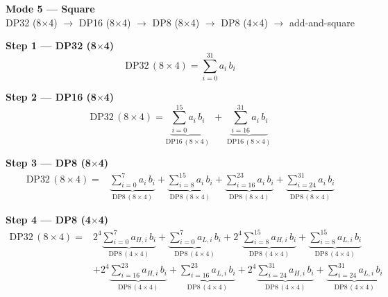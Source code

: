 \documentclass[fleqn]{article}
\newcommand{\DPop}[3]{\mathrm{DP#1}\,(#2\!\times\!#3)}
\begin{document}
\begin{center}
{\LARGE \textbf{Mode 5 --- Square}}\\[4pt]
{\large DP32 (8$\times$4) $\rightarrow$ DP16 (8$\times$4) $\rightarrow$ DP8 (8$\times$4) $\rightarrow$ DP8 (4$\times$4) $\rightarrow$ add-and-square}
\end{center}

\vspace{0.1em}

\textbf{Step 1 --- DP32 (8$\times$4)}
\[
\DPop{32}{8}{4} = \sum_{i=0}^{31} a_i \, b_i
\]

\textbf{Step 2 --- DP16 (8$\times$4)}
\[
\DPop{32}{8}{4}
  = \underbrace{\sum_{i=0}^{15} a_i \, b_i}_{\DPop{16}{8}{4}}
  \; + \; \underbrace{\sum_{i=16}^{31} a_i \, b_i}_{\DPop{16}{8}{4}}
\]

\textbf{Step 3 --- DP8 (8$\times$4)}
\begin{align*}
\DPop{32}{8}{4} = {}
  & \underbrace{\sum_{i=0}^{7} a_i \, b_i}_{\DPop{8}{8}{4}}
  + \underbrace{\sum_{i=8}^{15} a_i \, b_i}_{\DPop{8}{8}{4}}
  + \underbrace{\sum_{i=16}^{23} a_i \, b_i}_{\DPop{8}{8}{4}}
  + \underbrace{\sum_{i=24}^{31} a_i \, b_i}_{\DPop{8}{8}{4}}
\end{align*}

\textbf{Step 4 --- DP8 (4$\times$4)}
\begin{align*}
\DPop{32}{8}{4} = {}
  & 2^{4}\underbrace{\sum_{i=0}^{7} a_{H,i}\, b_i}_{\DPop{8}{4}{4}}
  + \underbrace{\sum_{i=0}^{7} a_{L,i}\, b_i}_{\DPop{8}{4}{4}}
  + 2^{4}\underbrace{\sum_{i=8}^{15} a_{H,i}\, b_i}_{\DPop{8}{4}{4}}
  + \underbrace{\sum_{i=8}^{15} a_{L,i}\, b_i}_{\DPop{8}{4}{4}} \\[0.6em]
  & + 2^{4}\underbrace{\sum_{i=16}^{23} a_{H,i}\, b_i}_{\DPop{8}{4}{4}}
  + \underbrace{\sum_{i=16}^{23} a_{L,i}\, b_i}_{\DPop{8}{4}{4}}
  + 2^{4}\underbrace{\sum_{i=24}^{31} a_{H,i}\, b_i}_{\DPop{8}{4}{4}}
  + \underbrace{\sum_{i=24}^{31} a_{L,i}\, b_i}_{\DPop{8}{4}{4}}
\end{align*}
\end{document}
